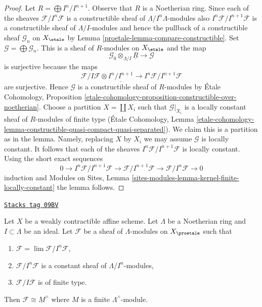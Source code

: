 \begin{proof}

Let $R = \bigoplus I^n/I^{n + 1}$. Observe that $R$ is a Noetherian ring.
Since each of the sheaves
$\mathcal{F}/I^n\mathcal{F}$ is a constructible sheaf of
$\Lambda/I^n\Lambda$-modules also $I^n\mathcal{F}/I^{n + 1}\mathcal{F}$
is a constructible sheaf of $\Lambda/I$-modules and hence the pullback
of a constructible sheaf $\mathcal{G}_n$ on $X_\etale$ by
Lemma \ref{proetale-lemma-compare-constructible}.
Set $\mathcal{G} = \bigoplus \mathcal{G}_n$. This is a sheaf
of $R$-modules on $X_\etale$ and the map
$$
\mathcal{G}_0 \otimes_{\Lambda/I} \underline{R}
\longrightarrow
\mathcal{G}
$$
is surjective because the maps
$$
\mathcal{F}/I\mathcal{F} \otimes \underline{I^n/I^{n + 1}} \to
I^n\mathcal{F}/I^{n + 1}\mathcal{F}
$$
are surjective. Hence $\mathcal{G}$ is a constructible sheaf of
$R$-modules by \'Etale Cohomology, Proposition
\ref{etale-cohomology-proposition-constructible-over-noetherian}.
Choose a partition $X = \coprod X_i$ such that
$\mathcal{G}|_{X_i}$ is a locally constant sheaf of $R$-modules
of finite type (\'Etale Cohomology, Lemma
\ref{etale-cohomology-lemma-constructible-quasi-compact-quasi-separated}).
We claim this is a partition as in the lemma.
Namely, replacing $X$ by $X_i$ we may assume $\mathcal{G}$ is locally
constant. It follows that each of the sheaves
 $I^n\mathcal{F}/I^{n + 1}\mathcal{F}$
is locally constant. Using the short exact sequences
$$
0 \to I^n\mathcal{F}/I^{n + 1}\mathcal{F} \to
\mathcal{F}/I^{n + 1}\mathcal{F} \to \mathcal{F}/I^n\mathcal{F} \to 0
$$
induction and Modules on Sites, Lemma
\ref{sites-modules-lemma-kernel-finite-locally-constant}
the lemma follows.
\end{proof}

\begin{lemma}[Weird]
\label{proetale-lemma-weird}
\href{https://stacks.math.columbia.edu/tag/09BV}{\texttt{Stacks tag 09BV}}

Let $X$ be a weakly contractible affine scheme. Let $\Lambda$ be a Noetherian
ring and $I \subset \Lambda$ be an ideal. Let $\mathcal{F}$ be a sheaf of
$\Lambda$-modules on $X_\proetale$ such that
\begin{enumerate}
\item $\mathcal{F} = \lim \mathcal{F}/I^n\mathcal{F}$,
\item $\mathcal{F}/I^n\mathcal{F}$ is a constant sheaf of
$\Lambda/I^n$-modules,
\item $\mathcal{F}/I\mathcal{F}$ is of finite type.
\end{enumerate}
Then $\mathcal{F} \cong \underline{M}^\wedge$ where $M$ is
a finite $\Lambda^\wedge$-module.
\end{lemma}

